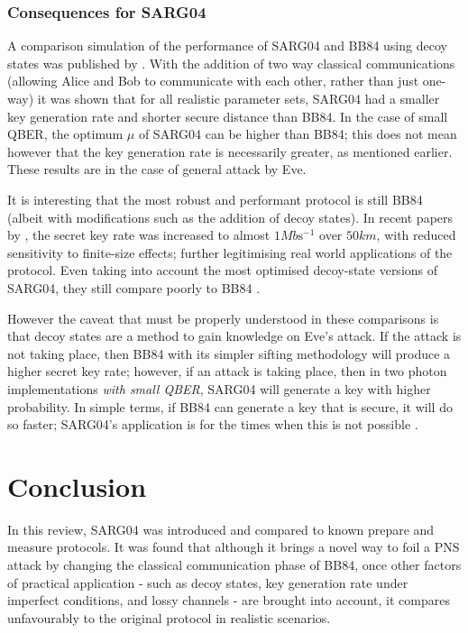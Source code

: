 \documentclass[paper=a4, fontsize=11pt]{scrartcl} %
\numberwithin{equation}{section} %
\numberwithin{figure}{section} %
\numberwithin{table}{section} %
\begin{document}
\subsubsection*{Consequences for SARG04}

A comparison simulation of the performance of SARG04 and BB84 using decoy states was published by \citet{perf2protocols}. With the
addition of two way classical communications (allowing Alice and Bob to communicate with each other, rather than just
one-way) it was shown that for all realistic parameter sets, SARG04 had a smaller key generation rate and shorter secure
distance than BB84. In the case of small QBER, the optimum $\mu$ of SARG04 can be higher than BB84; this does not mean
however that the key generation rate is necessarily greater, as mentioned earlier. These results are in the case of general
attack by Eve.

It is interesting that the most robust and performant protocol is still BB84 (albeit with modifications such as the addition of
decoy states). In recent papers by \citet{recentDecoyBounds, recentDecoy}, the secret key rate was increased to almost $1\si{Mb \s^{-1}}$
over $50\si{km}$, with reduced sensitivity to finite-size effects; further legitimising real world applications of the protocol.
Even taking into account the most optimised decoy-state versions of SARG04, they still compare poorly to BB84 \citep{recentDecoySARG04}.

However the caveat that must be properly understood in these comparisons is that decoy states are a method to
gain knowledge on Eve's attack. If the attack is not taking place, then BB84 with its simpler sifting methodology
will produce a higher secret key rate; however, if an attack is taking place, then in two photon implementations
\textit{with small QBER}, SARG04 will generate a key with higher probability. In simple terms,
if BB84 can generate a key that is secure, it will do so faster; SARG04's application is for the times when this is
not possible \citep{perf2protocols, reviewScariani}.

\clearpage
\section{Conclusion}
In this review, SARG04 was introduced and compared to known prepare and measure protocols. It was found that although
it brings a novel way to foil a PNS attack by changing the classical communication phase of BB84, once other factors
of practical application - such as decoy states, key generation rate under imperfect conditions, and lossy channels -
are brought into account, it compares unfavourably to the original protocol in realistic scenarios.
\end{document}
